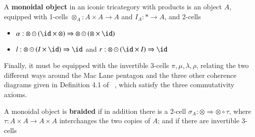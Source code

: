 \documentclass{amsart}
\begin{document}
\begin{defn}
A {\bf monoidal object} in an iconic tricategory with products is an object $A$, equipped with 1-cells $\otimes_A: A \times A \rightarrow A$ and $I_A: * \rightarrow A$, and 2-cells
\begin{itemize} 
\item $\alpha: \otimes \odot (\id \times \otimes) \Rightarrow \otimes \odot (\otimes \times \id)$
\item $l: \otimes \odot (I \times \id) \Rightarrow \id$ and $r:\otimes \odot (\id \times I) \Rightarrow \id$ 
\end{itemize}
Finally, it must be equipped with the invertible 3-cells $\pi, \mu, \lambda, \rho$, relating the two different ways around the Mac Lane pentagon and the three other coherence diagrams given in Definition 4.1 of ~\cite{nick:tricatsbook}, which satisfy the three commutativity axioms. 

A monoidal object is {\bf braided} if in addition there is a 2-cell $\sigma_A: \otimes \Rightarrow \otimes \circ \tau$, where $\tau: A \times A \rightarrow A \times A$ interchanges the two copies of $A$; and if there are invertible 3-cells 


\end{defn}
\end{document}
